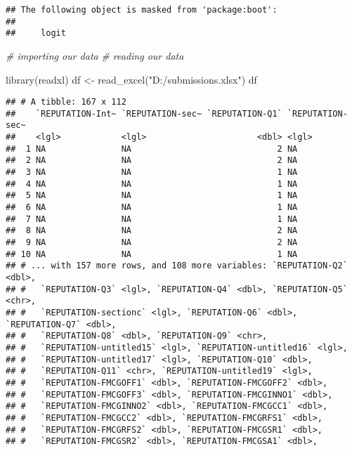 \documentclass[
]{article}
\newenvironment{Shaded}{\begin{snugshade}}{\end{snugshade}}
\newcommand{\CommentTok}[1]{\textcolor[rgb]{0.56,0.35,0.01}{\textit{#1}}}
\newcommand{\FunctionTok}[1]{\textcolor[rgb]{0.00,0.00,0.00}{#1}}
\newcommand{\NormalTok}[1]{#1}
\newcommand{\OtherTok}[1]{\textcolor[rgb]{0.56,0.35,0.01}{#1}}
\newcommand{\StringTok}[1]{\textcolor[rgb]{0.31,0.60,0.02}{#1}}
\begin{document}
\begin{verbatim}
## The following object is masked from 'package:boot':
## 
##     logit
\end{verbatim}

\begin{Shaded}
\begin{Highlighting}[]
\CommentTok{\# importing our data}
\CommentTok{\# reading our data}

\FunctionTok{library}\NormalTok{(readxl)}
\NormalTok{df }\OtherTok{\textless{}{-}} \FunctionTok{read\_excel}\NormalTok{(}\StringTok{"D:/submissions.xlsx"}\NormalTok{)}
\NormalTok{df}
\end{Highlighting}
\end{Shaded}

\begin{verbatim}
## # A tibble: 167 x 112
##    `REPUTATION-Int~ `REPUTATION-sec~ `REPUTATION-Q1` `REPUTATION-sec~
##    <lgl>            <lgl>                      <dbl> <lgl>           
##  1 NA               NA                             2 NA              
##  2 NA               NA                             2 NA              
##  3 NA               NA                             1 NA              
##  4 NA               NA                             1 NA              
##  5 NA               NA                             1 NA              
##  6 NA               NA                             1 NA              
##  7 NA               NA                             1 NA              
##  8 NA               NA                             2 NA              
##  9 NA               NA                             2 NA              
## 10 NA               NA                             1 NA              
## # ... with 157 more rows, and 108 more variables: `REPUTATION-Q2` <dbl>,
## #   `REPUTATION-Q3` <lgl>, `REPUTATION-Q4` <dbl>, `REPUTATION-Q5` <chr>,
## #   `REPUTATION-sectionc` <lgl>, `REPUTATION-Q6` <dbl>, `REPUTATION-Q7` <dbl>,
## #   `REPUTATION-Q8` <dbl>, `REPUTATION-Q9` <chr>,
## #   `REPUTATION-untitled15` <lgl>, `REPUTATION-untitled16` <lgl>,
## #   `REPUTATION-untitled17` <lgl>, `REPUTATION-Q10` <dbl>,
## #   `REPUTATION-Q11` <chr>, `REPUTATION-untitled19` <lgl>,
## #   `REPUTATION-FMCGOFF1` <dbl>, `REPUTATION-FMCGOFF2` <dbl>,
## #   `REPUTATION-FMCGOFF3` <dbl>, `REPUTATION-FMCGINNO1` <dbl>,
## #   `REPUTATION-FMCGINNO2` <dbl>, `REPUTATION-FMCGCC1` <dbl>,
## #   `REPUTATION-FMCGCC2` <dbl>, `REPUTATION-FMCGRFS1` <dbl>,
## #   `REPUTATION-FMCGRFS2` <dbl>, `REPUTATION-FMCGSR1` <dbl>,
## #   `REPUTATION-FMCGSR2` <dbl>, `REPUTATION-FMCGSA1` <dbl>,

\end{verbatim}
\end{document}
